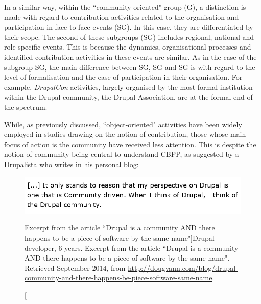 In a similar way, within the ``community-oriented" group (G), a distinction is made with regard to contribution activities related to the organisation and participation in face-to-face events (SG). In this case, they are differentiated by their scope. The second of these subgroups (SG) includes regional, national and role-specific events. This is because the dynamics, organisational processes and identified contribution activities in these events are similar. As in the case of the subgroup SG, the main difference between SG, SG and SG is with regard to the level of formalisation and the ease of participation in their organisation. For example, \textit{DrupalCon}  activities, largely organised by the most formal institution within the Drupal community, the Drupal Association, are at the formal end of the spectrum.

While, as previously discussed, ``object-oriented" activities have been widely employed in studies drawing on the notion of contribution, those whose main focus of action is the community have received less attention. This is despite the notion of community being central to understand CBPP, as suggested by a Drupalista who writes in his personal blog:

\begin{figure}[H]
    \centering
\includegraphics[scale=0.45]{img/quotes_replacement/quote_dougvann_com.png}
    \caption[Excerpt from the article ``Drupal is a community AND there happens to be a piece of software by the same name"]{Drupal developer, 6 years\protect\footnotemark . Excerpt from the article ``Drupal is a community AND there happens to be a piece of software by the same name". Retrieved  September 2014, from \url{http://dougvann.com/blog/drupal-community-and-there-happens-be-piece-software-same-name}.}
    \label{quote_dougvann}
\end{figure}


